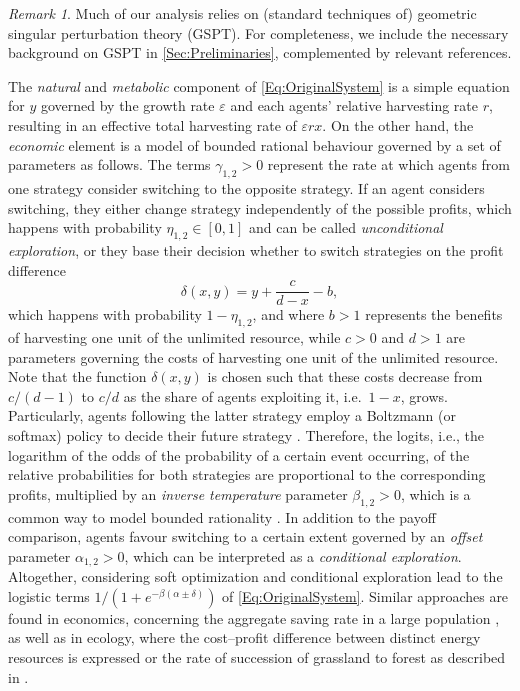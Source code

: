 \documentclass[3p]{elsarticle}
\theoremstyle{plain}
\theoremstyle{remark}
\newtheorem{remark}{Remark}
\theoremstyle{definition}
\begin{document}
    \begin{remark}
        Much of our analysis relies on (standard techniques of) geometric singular perturbation theory (GSPT). For completeness, we include the necessary background on GSPT in \ref{Sec:Preliminaries}, complemented by relevant references. 
    \end{remark}
    
    The \emph{natural} and \emph{metabolic} component of \eqref{Eq:OriginalSystem} is a simple equation for $y$ governed by the growth rate $\varepsilon$ and each agents' relative harvesting rate $r$, resulting in an effective total harvesting rate of $\varepsilon r x$. On the other hand, the \emph{economic} element is a model of bounded rational behaviour governed by a set of parameters as follows. The terms $\gamma_{1,2}>0$ represent the rate at which agents from one strategy consider switching to the opposite strategy. If an agent considers switching, they either change strategy independently of the possible profits, which happens with probability $\eta_{1,2}\in[0,1]$ and can be called \emph{unconditional exploration}, or they base their decision whether to switch strategies on the profit difference 
    \begin{equation}
        \delta(x,y) = y + \frac{c}{d-x}-b,
        \label{Eq:ProfitDifference}
    \end{equation}
    which happens with probability $1-\eta_{1,2}$, and where $b>1$ represents the benefits of harvesting one unit of the unlimited resource, while $c>0$ and $d>1$ are parameters governing the costs of harvesting one unit of the unlimited resource. Note that the function $\delta(x,y)$ is chosen such that these costs decrease from $c/(d-1)$ to $c/d$ as the share of agents exploiting it, i.e.~$1-x$, grows. Particularly, agents following the latter strategy employ a Boltzmann (or softmax) policy to decide their future strategy \cite{Ref:Achbany2008, Ref:Bianchi2017}. Therefore, the logits, i.e., the logarithm of the odds of the probability of a certain event occurring, of the relative probabilities for both strategies are proportional to the corresponding profits, multiplied by an \emph{inverse temperature} parameter $\beta_{1,2}>0$, which is a common way to model bounded rationality \cite{Ref:Herbert1997, Ref:Lorkowski2017}. In addition to the payoff comparison, agents favour switching to a certain extent governed by an \emph{offset} parameter $\alpha_{1,2}>0$, which can be interpreted as a \emph{conditional exploration}. Altogether, considering soft optimization and conditional exploration lead to the logistic terms $1 / (1 + e^{-\beta(\alpha\pm\delta)})$ of \eqref{Eq:OriginalSystem}.  
    Similar approaches are found in economics, concerning the aggregate saving rate in a large population \cite{Ref:Asano2021}, as well as in ecology, where the cost--profit difference between distinct energy resources is expressed \cite{Ref:Zeppini2020} or the rate of succession of grassland to forest as described in
    \cite{Ref:Innes2013}. 
\end{document}
